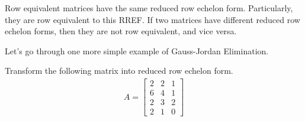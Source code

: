 \begin{proper}
\label{proper:rowequivreduce}
Row equivalent matrices have the same reduced row echelon form. Particularly, they are row equivalent to this RREF. If two matrices have different reduced row echelon forms, then they are not row equivalent, and vice versa.
\end{proper}
Let's go through one more simple example of Gauss-Jordan Elimination.
\begin{exmp}
\label{exmp:rref2}
Transform the following matrix into reduced row echelon form.
\begin{align*}
A =
\begin{bmatrix}
2 & 2 & 1 \\
6 & 4 & 1 \\
2 & 3 & 2 \\
2 & 1 & 0
\end{bmatrix}    
\end{align*}
\end{exmp}
